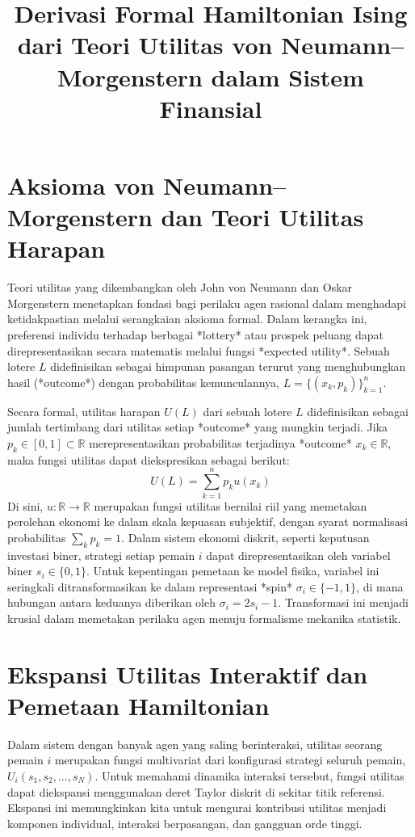 \documentclass[12pt]{article}
\title{Derivasi Formal Hamiltonian Ising dari Teori Utilitas von Neumann--Morgenstern dalam Sistem Finansial}
\author{}
\date{}
\begin{document}
\maketitle

\section{Aksioma von Neumann--Morgenstern dan Teori Utilitas Harapan}

Teori utilitas yang dikembangkan oleh John von Neumann dan Oskar Morgenstern menetapkan fondasi bagi perilaku agen rasional dalam menghadapi ketidakpastian melalui serangkaian aksioma formal. Dalam kerangka ini, preferensi individu terhadap berbagai *lottery* atau prospek peluang dapat direpresentasikan secara matematis melalui fungsi *expected utility*. Sebuah lotere $L$ didefinisikan sebagai himpunan pasangan terurut yang menghubungkan hasil (*outcome*) dengan probabilitas kemunculannya, $L = \{(x_k, p_k)\}_{k=1}^n$.

Secara formal, utilitas harapan $U(L)$ dari sebuah lotere $L$ didefinisikan sebagai jumlah tertimbang dari utilitas setiap *outcome* yang mungkin terjadi. Jika $p_k \in [0, 1] \subset \mathbb{R}$ merepresentasikan probabilitas terjadinya *outcome* $x_k \in \mathbb{R}$, maka fungsi utilitas dapat diekspresikan sebagai berikut:
\begin{equation}
U(L) = \sum_{k=1}^n p_k u(x_k) \tag{1}
\end{equation}
Di sini, $u: \mathbb{R} \to \mathbb{R}$ merupakan fungsi utilitas bernilai riil yang memetakan perolehan ekonomi ke dalam skala kepuasan subjektif, dengan syarat normalisasi probabilitas $\sum_k p_k = 1$. Dalam sistem ekonomi diskrit, seperti keputusan investasi biner, strategi setiap pemain $i$ dapat direpresentasikan oleh variabel biner $s_i \in \{0, 1\}$. Untuk kepentingan pemetaan ke model fisika, variabel ini seringkali ditransformasikan ke dalam representasi *spin* $\sigma_i \in \{-1, 1\}$, di mana hubungan antara keduanya diberikan oleh $\sigma_i = 2s_i - 1$. Transformasi ini menjadi krusial dalam memetakan perilaku agen menuju formalisme mekanika statistik.

\section{Ekspansi Utilitas Interaktif dan Pemetaan Hamiltonian}

Dalam sistem dengan banyak agen yang saling berinteraksi, utilitas seorang pemain $i$ merupakan fungsi multivariat dari konfigurasi strategi seluruh pemain, $U_i(s_1, s_2, \dots, s_N)$. Untuk memahami dinamika interaksi tersebut, fungsi utilitas dapat diekspansi menggunakan deret Taylor diskrit di sekitar titik referensi. Ekspansi ini memungkinkan kita untuk mengurai kontribusi utilitas menjadi komponen individual, interaksi berpasangan, dan gangguan orde tinggi.
\end{document}
